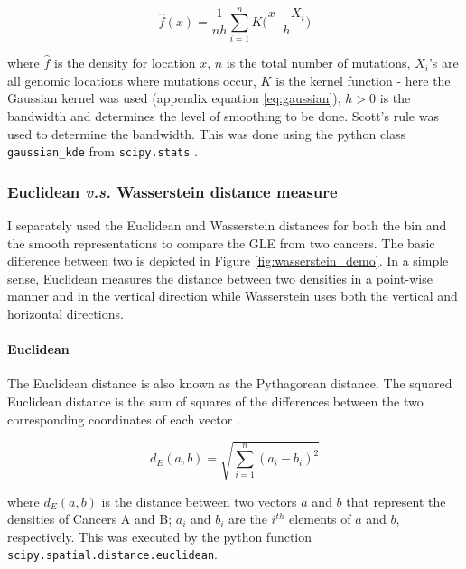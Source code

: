 \begin{equation}
    \hat{f}(x) = \frac{1}{nh} \underset{i=1}{\overset{n}{\sum}} K\Big(\frac{x- X_i}{h}\Big)
    \label{eq:density}
\end{equation}

where $\hat{f}$ is the density for location $x$, $n$ is the total number of mutations, $X_i$'s are all genomic locations where mutations occur, $K$ is the kernel function - here the Gaussian kernel was used (appendix equation \ref{eq:gaussian}), $h>0$ is the bandwidth and determines the level of smoothing to be done. Scott's rule \citep[appendix equation \ref{eq:bandwidth};][]{Scott1992MultivariateEstimation} was used to determine the bandwidth. This was done using the python class \texttt{gaussian\_kde} from \texttt{scipy.stats} \citep{2020SciPy-NMeth}.

\subsubsection{Euclidean \textit{v.s.} Wasserstein distance measure}
I separately used the Euclidean \citep{ONeill2006FrameFields} and Wasserstein \citep{Kolouri2017OptimalApplications} distances for both the bin and the smooth representations to compare the GLE from two cancers. The basic difference between two is depicted in Figure \ref{fig:wasserstein_demo}. In a simple sense, Euclidean measures the distance between two densities in a point-wise manner and in the vertical direction while Wasserstein uses both the vertical and horizontal directions. 



\paragraph{Euclidean} The Euclidean distance is also known as the Pythagorean distance. The squared Euclidean distance is the sum of squares of the differences between the two corresponding coordinates of each vector \citep[equation \ref{eq:euclid};][]{ONeill2006FrameFields}.

\begin{equation}
    d_E(a,b) = \sqrt{\sum_{i=1}^n (a_i - b_i)^2}
    \label{eq:euclid}
\end{equation}

where $d_E(a,b)$ is the distance between two vectors $a$ and $b$ that represent the densities of Cancers A and B; $a_i$ and $b_i$ are the $i^{th}$ elements of $a$ and $b$, respectively. This was executed by the python function \texttt{scipy.spatial.distance.euclidean}.

